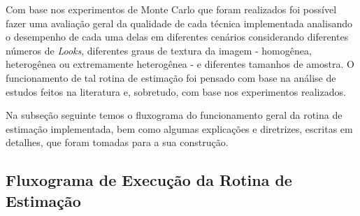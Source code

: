 Com base nos experimentos de Monte Carlo que foram realizados foi possível fazer uma avaliação geral da qualidade de cada técnica implementada analisando o desempenho de cada uma delas em diferentes cenários considerando diferentes números de \textit{Looks}, diferentes graus de textura da imagem - homogênea, heterogênea ou extremamente heterogênea - e diferentes tamanhos de amostra. O funcionamento de tal rotina de estimação foi pensado com base na análise de estudos feitos na literatura e, sobretudo, com base nos experimentos realizados.

Na subseção seguinte temos o fluxograma do funcionamento geral da rotina de estimação implementada, bem como algumas explicações e diretrizes, escritas em detalhes, que foram tomadas para a sua construção. 

\subsection{Fluxograma de Execução da Rotina de Estimação}

